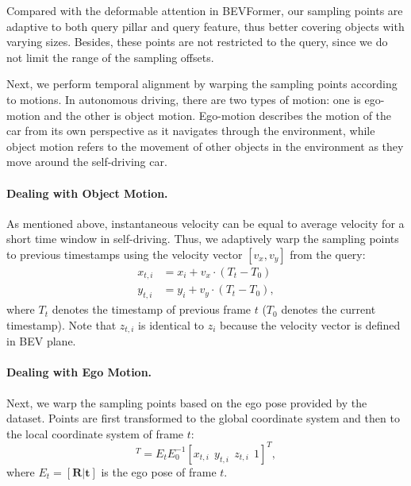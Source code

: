 \documentclass[10pt,twocolumn,letterpaper]{article}
\begin{document}
Compared with the deformable attention in BEVFormer, our sampling points are adaptive to both query pillar and query feature, thus better covering objects with varying sizes. Besides, these points are not restricted to the query, since we do not limit the range of the sampling offsets.

Next, we perform temporal alignment by warping the sampling points according to motions. In autonomous driving, there are two types of motion: one is ego-motion and the other is object motion. Ego-motion describes the motion of the car from its own perspective as it navigates through the environment, while object motion refers to the movement of other objects in the environment as they move around the self-driving car.

\vspace{-5pt}
\paragraph{Dealing with Object Motion.} As mentioned above, instantaneous velocity can be equal to average velocity for a short time window in self-driving. Thus, we adaptively warp the sampling points to previous timestamps using the velocity vector $[v_x, v_y]$ from the query:
\begin{align}
  x_{t, i} &= x_i + v_x \cdot (T_t - T_0) \\
  y_{t, i} &= y_i + v_y \cdot (T_t - T_0),
\end{align}
where $T_t$ denotes the timestamp of previous frame $t$ ($T_0$ denotes the current timestamp). Note that $z_{t, i}$ is identical to $z_i$ because the velocity vector is defined in BEV plane.

\vspace{-5pt}
\paragraph{Dealing with Ego Motion.} Next, we warp the sampling points based on the ego pose provided by the dataset. Points are first transformed to the global coordinate system and then to the local coordinate system of frame $t$:
\begin{equation}
  [x_{t, i}' \ \ \ y_{t, i}' \ \ \ z_{t, i}' \ \ \ 1]^T = E_t E_0^{-1}
  [x_{t, i} \ \  y_{t, i} \ \ z_{t, i} \ \ 1]^T,
\end{equation}
where $E_t = [\mathbf{R} | \mathbf{t}]$ is the ego pose of frame $t$.
\end{document}

